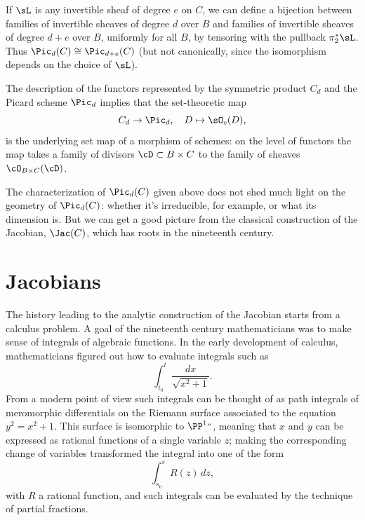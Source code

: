 If $\sL$ is any invertible sheaf of degree $e$ on $C$, we can define a
bijection between families of invertible sheaves of degree $d$ over
%
$B$ and families of invertible sheaves of degree $d+e$ over $B$,
uniformly for all $B$, by tensoring with the pullback $\pi_2^*\sL$.
Thus $\Pic_d(C) \cong \Pic_{d+e}(C)$ (but not canonically, since the
isomorphism depends on the choice of $\sL$).

The description of the functors represented by the symmetric product $C_d$ and the Picard scheme $\Pic_d$ implies that the
set-theoretic map
$$
C_d \to \Pic_d, \quad D \mapsto \sO_c(D),
$$
is the underlying set map of a morphism of schemes: on the level of functors the map takes a family of divisors $\cD\subset B\times C$
to the family of sheaves $\cO_{B\times C}(\cD)$.

The characterization of $\Pic_d(C)$
given
above does not shed much light on the geometry of $\Pic_d(C)$: whether
it's irreducible, for example, or what its dimension is. But we can
get a  good picture from the classical construction of the Jacobian,
$\Jac(C)$, which has roots in the nineteenth century.

\section{Jacobians}

The history leading to the analytic construction of the Jacobian
%
starts from a
calculus
%
%
problem. A goal of the nineteenth century
mathematicians was  to make sense of
integrals of algebraic functions.
%
In the early development of calculus, mathematicians figured out how
to evaluate integrals such as
$$
\int_{t_0}^t \frac{dx}{\sqrt{x^2+1}}.
$$
From a modern point of view such integrals can be thought of as
path integrals
%
of
meromorphic differentials
%
on the
Riemann surface
%
associated to the equation $y^2 = x^2+1$. This surface is isomorphic
to $\PP^1` `$, meaning that $x$ and $y$ can be expressed as rational
functions of a single variable $z$; making the corresponding change of
variables transformed the integral into one of the form
$$
\int_{s_0}^s R(z)\,dz,
$$
with $R$ a rational function, and such integrals can be evaluated by the technique of partial fractions.

